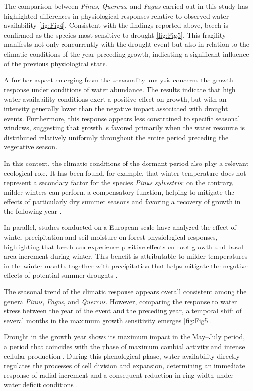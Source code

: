 \documentclass[12pt, a4paper]{article}
\begin{document}
The comparison between \textit{Pinus}, \textit{Quercus}, and \textit{Fagus} carried out in this study has highlighted differences in physiological responses relative to observed water availability \cref{fig:Fig4}. Consistent with the findings reported above, beech is confirmed as the species most sensitive to drought \cref{fig:Fig5}. This fragility manifests not only concurrently with the drought event but also in relation to the climatic conditions of the year preceding growth, indicating a significant influence of the previous physiological state.

A further aspect emerging from the seasonality analysis concerns the growth response under conditions of water abundance. The results indicate that high water availability conditions exert a positive effect on growth, but with an intensity generally lower than the negative impact associated with drought events. Furthermore, this response appears less constrained to specific seasonal windows, suggesting that growth is favored primarily when the water resource is distributed relatively uniformly throughout the entire period preceding the vegetative season.

In this context, the climatic conditions of the dormant period also play a relevant ecological role. It has been found, for example, that winter temperature does not represent a secondary factor for the species \textit{Pinus sylvestris}; on the contrary, milder winters can perform a compensatory function, helping to mitigate the effects of particularly dry summer seasons and favoring a recovery of growth in the following year \parencite{harvey2020}.

In parallel, studies conducted on a European scale have analyzed the effect of winter precipitation and soil moisture on forest physiological responses, highlighting that beech can experience positive effects on root growth and basal area increment during winter. This benefit is attributable to milder temperatures in the winter months together with precipitation that helps mitigate the negative effects of potential summer droughts \parencite{garthen2025}.

The seasonal trend of the climatic response appears overall consistent among the genera \textit{Pinus}, \textit{Fagus}, and \textit{Quercus}. However, comparing the response to water stress between the year of the event and the preceding year, a temporal shift of several months in the maximum growth sensitivity emerges \cref{fig:Fig5}.

Drought in the growth year shows its maximum impact in the May--July period, a period that coincides with the phase of maximum cambial activity and intense cellular production \parencite{rossi2007, cuny2015}. During this phenological phase, water availability directly regulates the processes of cell division and expansion, determining an immediate response of radial increment and a consequent reduction in ring width under water deficit conditions \parencite{korner2015}.
\end{document}
